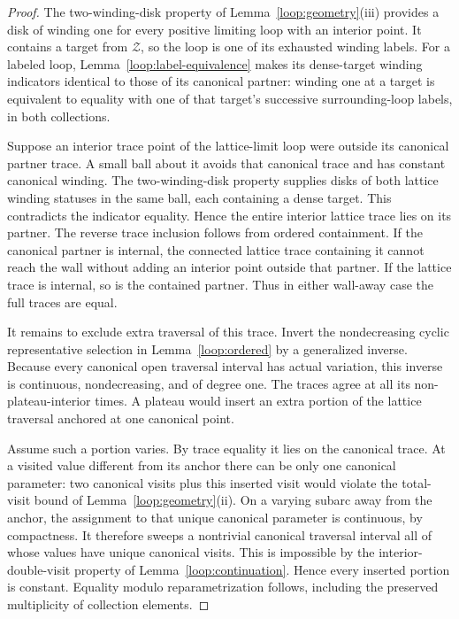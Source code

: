\begin{proof}
The two-winding-disk property of Lemma~\ref{loop:geometry}(iii)
provides a disk of winding one for every positive limiting loop with
an interior point.  It contains a target from $\mathcal Z$, so the
loop is one of its exhausted winding labels.  For a labeled loop,
Lemma~\ref{loop:label-equivalence} makes its dense-target winding
indicators identical to those of its canonical partner: winding one
at a target is equivalent to equality with one of that target's
successive surrounding-loop labels, in both collections.

Suppose an interior trace point of the lattice-limit loop were outside
its canonical partner trace.  A small ball about it avoids that
canonical trace and has constant canonical winding.  The two-winding-disk
property supplies disks of both lattice winding statuses in the
same ball, each containing a dense target.  This contradicts the
indicator equality.  Hence the entire interior lattice trace lies
on its partner.  The reverse trace inclusion follows from ordered
containment.  If the canonical partner is internal, the connected
lattice trace containing it cannot reach the wall without adding an
interior point outside that partner.  If the lattice trace is internal,
so is the contained partner.  Thus in either wall-away case the full
traces are equal.

It remains to exclude extra traversal of this trace.  Invert the
nondecreasing cyclic representative selection in
Lemma~\ref{loop:ordered} by a generalized inverse.  Because every
canonical open traversal interval has actual variation, this inverse
is continuous, nondecreasing, and of degree one.  The traces agree at
all its non-plateau-interior times.  A plateau would insert an extra
portion of the lattice traversal anchored at one canonical point.

Assume such a portion varies.  By trace equality it lies on the
canonical trace.  At a visited value different from its anchor there
can be only one canonical parameter: two canonical visits plus this
inserted visit would violate the total-visit bound of
Lemma~\ref{loop:geometry}(ii).  On a varying subarc away from the
anchor, the assignment to that unique canonical parameter is
continuous, by compactness.  It therefore sweeps a nontrivial canonical
traversal interval all of whose values have unique canonical visits.
This is impossible by the interior-double-visit property of
Lemma~\ref{loop:continuation}.  Hence every inserted portion is
constant.  Equality modulo reparametrization follows, including the
preserved multiplicity of collection elements.
\end{proof}

